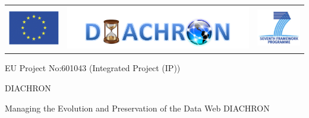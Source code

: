 \documentclass[a4paper]{article}
\begin{document}
\begin{titlepage}

\begin{center}
  \begin{tabular}{ccc}
    \includegraphics[width=.15\textwidth]{images/eu-logo.png} &
    \includegraphics[width=.6\textwidth]{images/diachron-logo.png} &
    \includegraphics[width=.15\textwidth]{images/fp7-logo.png}
  \end{tabular}
\end{center}

\vspace{4ex}
EU Project No:601043 (Integrated Project (IP))

\vspace{2ex}
DIACHRON

\vspace{2ex}
Managing the Evolution and Preservation of the Data Web DIACHRON


\end{titlepage}
\end{document}
